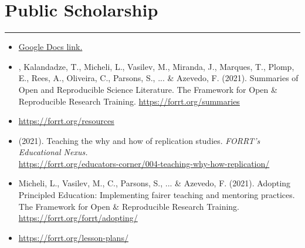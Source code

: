 \documentclass[letterpaper]{article}
\begin{document}
\section*{\color{Brown} Public Scholarship}
\vspace{-0.5em}
\hrule
\vspace{1em}
\begin{itemize}

\item[]{} \href{https://docs.google.com/document/d/17ECRs6J8spO3CU6siheGL8weQ-TzdyAUpXIiIE8cUeI/edit#}{\color{BlueViolet}Google Docs link.}

\item[]{, Kalandadze, T., Micheli, L., Vasilev, M., Miranda, J., Marques, T., Plomp, E., Rees, A., Oliveira, C., Parsons, S., ... \& Azevedo, F. (2021). Summaries of Open and Reproducible Science Literature. The Framework for Open \& Reproducible Research Training.} \href{https://forrt.org/summaries}{\color{BlueViolet}https://forrt.org/summaries}

\item[]{ \href{https://forrt.org/resources}{\color{BlueViolet}https://forrt.org/resources}}

\item[]{ (2021). Teaching the why and how of replication studies. \emph{FORRT's Educational Nexus.}} \\ \href{https://forrt.org/educators-corner/004-teaching-why-how-replication/}{\color{BlueViolet}https://forrt.org/educators-corner/004-teaching-why-how-replication/}

\item[]{\noindent Micheli, L., Vasilev, M., C., Parsons, S., ... \& Azevedo, F. (2021). Adopting Principled Education: Implementing fairer teaching and mentoring practices. The Framework for Open \& Reproducible Research Training.} \\ \href{https://forrt.org/forrt/adopting/}{\color{BlueViolet}https://forrt.org/forrt/adopting/}

\item[]{} \href{https://forrt.org/lesson-plans/}{\color{BlueViolet}https://forrt.org/lesson-plans/}


\end{itemize}
\end{document}
